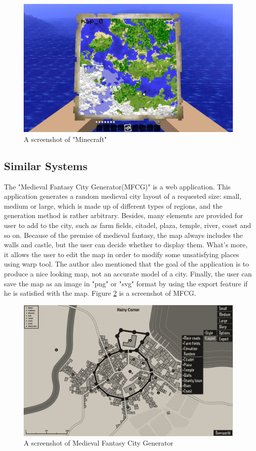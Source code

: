 \begin{figure}[htb]
\centering
\includegraphics[width=.9\textwidth]{section01/assets/screenshot_Minecraft.jpg}
\caption[A screenshot of "Minecraft"]{\label{Screenshot Minecraft}A screenshot of "Minecraft"}
\end{figure}

\subsection{Similar Systems}
The "Medieval Fantasy City Generator(MFCG)" is a web application. This application generates a random medieval city layout of a requested size: small, medium or large, which is made up of different types of regions, and the generation method is rather arbitrary. Besides, many elements are provided for user to add to the city, such as farm fields, citadel, plaza, temple, river, coast and so on. Because of the premise of medieval fantasy, the map always includes the walls and castle, but the user can decide whether to display them. What's more, it allows the user to edit the map in order to modify some unsatisfying places using warp tool. The author also mentioned that the goal of the application is to produce a nice looking map, not an accurate model of a city. Finally, the user can save the map as an image in "png" or "svg" format by using the export feature if he is satisfied with the map. Figure \ref{Screenshot MFCG} is a screenshot of MFCG.

\begin{figure}[htb]
\centering
\includegraphics[width=.9\textwidth]{section01/assets/screenshot_MFCG.png}
\caption[A screenshot of Medieval Fantasy City Generator]{\label{Screenshot MFCG}A screenshot of Medieval Fantasy City Generator}
\end{figure}

